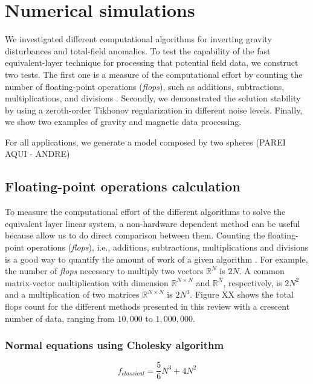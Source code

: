 \section{Numerical simulations}
\label{sec:num_simulations}

We investigated different computational algorithms for inverting gravity disturbances and total-field anomalies. To test the capability of the fast equivalent-layer technique for processing that potential field data, we construct two tests. The first one is a measure of the computational effort by counting the number of floating-point operations (\textit{flops}), such as additions, subtractions, multiplications, and divisions \citep{golub-vanloan2013}. Secondly, we demonstrated the solution stability by using a zeroth-order Tikhonov regularization in different noise levels. Finally, we show two examples of gravity and magnetic data processing.


For all applications, we generate a model composed by two spheres (PAREI AQUI - ANDRE)
%
\subsection{Floating-point operations calculation}

To measure the computational effort of the different algorithms to solve the equivalent layer linear system, a non-hardware dependent method can be useful because allow us to do direct comparison between them. Counting the floating-point operations (\textit{flops}), i.e., additions, subtractions, multiplications and divisions is a good way to quantify the amount of work of a given algorithm \citep{golub-vanloan2013}. For example, the number of \textit{flops} necessary to multiply two vectors $\mathbb{R}^{N}$ is $2N$. A common matrix-vector multiplication with dimension $\mathbb{R}^{N \times N}$ and $\mathbb{R}^{N}$, respectively, is $2N^2$ and a multiplication of two matrices $\mathbb{R}^{N \times N}$ is $2N^3$. Figure XX shows the total flops count for the different methods presented in this review with a crescent number of data, ranging from $10,000$ to $1,000,000$. 

\subsubsection{Normal equations using Cholesky algorithm}

\begin{equation}
	f_{classical} = \dfrac{5}{6} N^3 + 4N^2
\label{flops_classical}
\end{equation}

